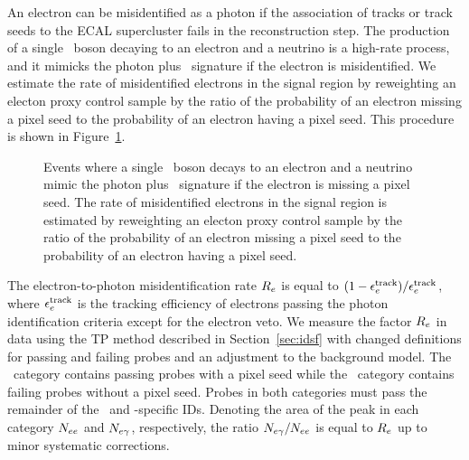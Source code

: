 An electron can be misidentified as a photon if the association of tracks or track seeds to the ECAL supercluster fails in the reconstruction step.
The production of a single \PW\ boson decaying to an electron and a neutrino is a high-rate process, and it mimicks the photon plus \met\ signature if the electron is misidentified.
We estimate the rate of misidentified electrons in the signal region by reweighting an electon proxy control sample by the ratio of the probability of an electron missing a pixel seed to the probability of an electron having a pixel seed. 
This procedure is shown in Figure~\ref{fig:efake_diagram}.

\begin{figure}[htbp]
  \centering
  \caption{
       Events where a single \PW\ boson decays to an electron and a neutrino mimic the photon plus \met\ signature if the electron is missing a pixel seed.
       The rate of misidentified electrons in the signal region is estimated by reweighting an electon proxy control sample by the ratio of the probability of an electron missing a pixel seed to the probability of an electron having a pixel seed.
    }
    \label{fig:efake_diagram}
\end{figure}

The electron-to-photon misidentification rate $R_{{e}}$ is equal to $(1 - \epsilon_{{e}}^{\text{track}}) / \epsilon_{{e}}^{\text{track}}$, where $\epsilon_{{e}}^{\text{track}}$ is the tracking efficiency of electrons passing the photon identification criteria except for the electron veto.
We measure the factor $R_{{e}}$ in data using the TP method described in Section~\ref{sec:idsf} with changed definitions for passing and failing probes and an adjustment to the background model.
The \Pe\Pe\ category contains passing probes with a pixel seed while the \Pe\Pgg\ category contains failing probes without a pixel seed.
Probes in both categories must pass the remainder of the \egamma\ and \Pgg-specific IDs.
Denoting the area of the peak in each category $N_{{e}{e}}$ and $N_{{e}\gamma}$, respectively, the ratio $N_{{e}\gamma} / N_{{e}{e}}$ is equal to $R_{{e}}$ up to minor systematic corrections.

